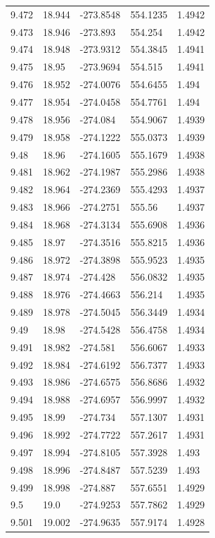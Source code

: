 \begin{tabular}{lllll}
9.472 & 18.944 & -273.8548 & 554.1235 & 1.4942 \\
9.473 & 18.946 & -273.893 & 554.254 & 1.4942 \\
9.474 & 18.948 & -273.9312 & 554.3845 & 1.4941 \\
9.475 & 18.95 & -273.9694 & 554.515 & 1.4941 \\
9.476 & 18.952 & -274.0076 & 554.6455 & 1.494 \\
9.477 & 18.954 & -274.0458 & 554.7761 & 1.494 \\
9.478 & 18.956 & -274.084 & 554.9067 & 1.4939 \\
9.479 & 18.958 & -274.1222 & 555.0373 & 1.4939 \\
9.48 & 18.96 & -274.1605 & 555.1679 & 1.4938 \\
9.481 & 18.962 & -274.1987 & 555.2986 & 1.4938 \\
9.482 & 18.964 & -274.2369 & 555.4293 & 1.4937 \\
9.483 & 18.966 & -274.2751 & 555.56 & 1.4937 \\
9.484 & 18.968 & -274.3134 & 555.6908 & 1.4936 \\
9.485 & 18.97 & -274.3516 & 555.8215 & 1.4936 \\
9.486 & 18.972 & -274.3898 & 555.9523 & 1.4935 \\
9.487 & 18.974 & -274.428 & 556.0832 & 1.4935 \\
9.488 & 18.976 & -274.4663 & 556.214 & 1.4935 \\
9.489 & 18.978 & -274.5045 & 556.3449 & 1.4934 \\
9.49 & 18.98 & -274.5428 & 556.4758 & 1.4934 \\
9.491 & 18.982 & -274.581 & 556.6067 & 1.4933 \\
9.492 & 18.984 & -274.6192 & 556.7377 & 1.4933 \\
9.493 & 18.986 & -274.6575 & 556.8686 & 1.4932 \\
9.494 & 18.988 & -274.6957 & 556.9997 & 1.4932 \\
9.495 & 18.99 & -274.734 & 557.1307 & 1.4931 \\
9.496 & 18.992 & -274.7722 & 557.2617 & 1.4931 \\
9.497 & 18.994 & -274.8105 & 557.3928 & 1.493 \\
9.498 & 18.996 & -274.8487 & 557.5239 & 1.493 \\
9.499 & 18.998 & -274.887 & 557.6551 & 1.4929 \\
9.5 & 19.0 & -274.9253 & 557.7862 & 1.4929 \\
9.501 & 19.002 & -274.9635 & 557.9174 & 1.4928 \\

\end{tabular}

